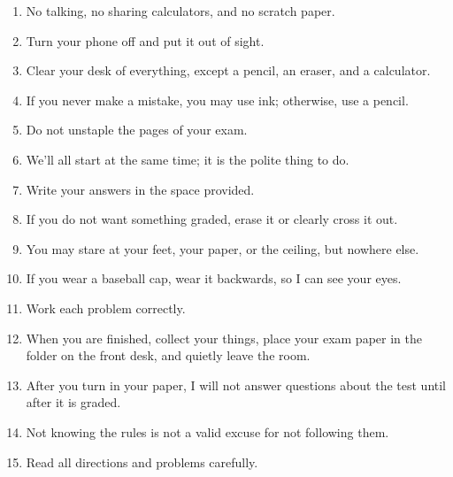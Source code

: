 \documentclass[12pt,fleqn]{exam}
\begin{document}
\begin{tcolorbox}
\begin{minipage}{6.5in}
\begin{enumerate}
    \item No talking, no sharing calculators, and no scratch paper.
    \item  Turn your phone off and put it out of sight.
    \item  Clear your desk of everything, except a pencil, an eraser, and a calculator.
    \item If you never make a mistake, you may use ink; otherwise, use a pencil.
    \item Do not unstaple the pages of your exam.
    \item We'll all start at the same time; it is  the polite thing to do.
    \item Write your answers in the space provided. 
    \item If you do not want something graded, erase it or clearly cross it out. 
    \item You may stare at your feet, your paper, or the ceiling, but nowhere else. 
    \item If you wear a  baseball cap, wear it backwards, so I can see your eyes.
    \item Work each problem correctly.
    \item When you are finished, collect your things, place your exam paper in the folder on the front desk,
    and quietly leave the room.
    \item After you turn in your paper, I will not answer questions about the test until after it is graded.
    
    \item Not knowing the rules is not a valid excuse for not following them.
    
    \item Read all directions and problems carefully. 
    \end{enumerate} 
    \end{minipage} 
    
    \end{tcolorbox}
\end{document}
